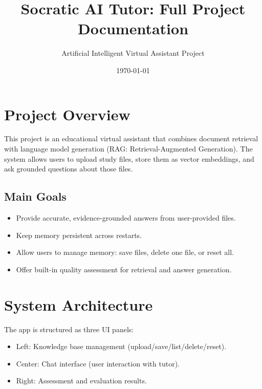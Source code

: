 \documentclass[11pt,a4paper]{article}
\title{Socratic AI Tutor: Full Project Documentation}
\author{Artificial Intelligent Virtual Assistant Project}
\date{\today}
\begin{document}
\maketitle
\tableofcontents
\newpage

\section{Project Overview}
This project is an educational virtual assistant that combines document retrieval with language model generation (RAG: Retrieval-Augmented Generation). The system allows users to upload study files, store them as vector embeddings, and ask grounded questions about those files.

\subsection{Main Goals}
\begin{itemize}[leftmargin=*]
\item Provide accurate, evidence-grounded answers from user-provided files.
\item Keep memory persistent across restarts.
\item Allow users to manage memory: save files, delete one file, or reset all.
\item Offer built-in quality assessment for retrieval and answer generation.
\end{itemize}

\section{System Architecture}
The app is structured as three UI panels:
\begin{itemize}[leftmargin=*]
\item Left: Knowledge base management (upload/save/list/delete/reset).
\item Center: Chat interface (user interaction with tutor).
\item Right: Assessment and evaluation results.
\end{itemize}
\end{document}
